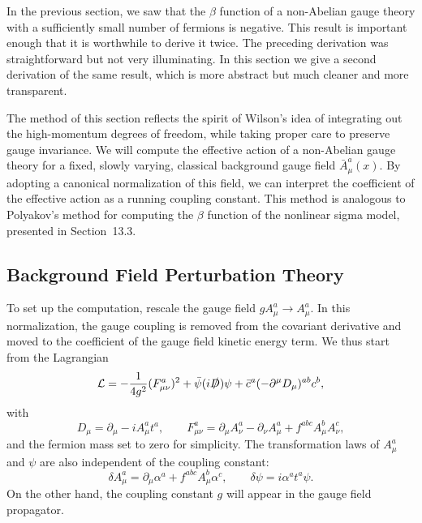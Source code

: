 In the previous section, we saw that the $\beta$ function of a non-Abelian
gauge theory with a sufficiently small number of fermions is negative.  This
result is important enough that it is worthwhile to derive it twice.  The
preceding derivation was straightforward but not very illuminating.  In this
section we give a second derivation of the same result, which is more
abstract but much cleaner and more transparent.

The method of this section reflects the spirit of Wilson's idea of
integrating out the high-momentum degrees of freedom, while taking proper
care to preserve gauge invariance.  We will compute the effective action of a
non-Abelian gauge theory for a fixed, slowly varying, classical background
gauge field $\bar{A}^a_\mu(x)$.  By adopting a canonical normalization of this
field, we can interpret the coefficient of the effective action as a running
coupling constant.  This method is analogous to Polyakov's method for
computing the $\beta$ function of the nonlinear sigma model, presented in
Section~13.3.

\subsection{Background Field Perturbation Theory}

To set up the computation, rescale the gauge field $gA^a_\mu \to A^a_\mu$.  In
this normalization, the gauge coupling is removed from the covariant
derivative and moved to the coefficient of the gauge field kinetic energy
term.  We thus start from the Lagrangian
\begin{equation}
  \mathcal{L} = -\frac{1}{4g^2}(F^a_{\mu\nu})^2 + \bar{\psi}(i\slashed{D})\psi
    + \bar{c}^a(-\partial^\mu D_\mu)^{ab}c^b ,
  \label{eq:16.90}
\end{equation}
with
\begin{equation}
  D_\mu = \partial_\mu - iA^a_\mu t^a,\qquad
  F^a_{\mu\nu} = \partial_\mu A^a_\nu - \partial_\nu A^a_\mu
    + f^{abc}A^b_\mu A^c_\nu ,
  \label{eq:16.91}
\end{equation}
and the fermion mass set to zero for simplicity.  The transformation laws of
$A^a_\mu$ and $\psi$ are also independent of the coupling constant:
\begin{equation}
  \delta A^a_\mu = \partial_\mu\alpha^a + f^{abc}A^b_\mu\alpha^c,\qquad
  \delta\psi = i\alpha^a t^a\psi .
  \label{eq:16.92}
\end{equation}
On the other hand, the coupling constant $g$ will appear in the gauge field
propagator.


